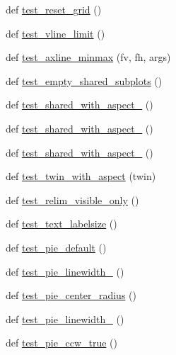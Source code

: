 \begin{DoxyCompactItemize}
\item 
def \hyperlink{namespacematplotlib_1_1tests_1_1test__axes_ac9fc7e9f7ca23303a131d7fdea76069c}{test\+\_\+reset\+\_\+grid} ()
\item 
def \hyperlink{namespacematplotlib_1_1tests_1_1test__axes_a420d03ee67bca5787ed020ebe9044e1a}{test\+\_\+vline\+\_\+limit} ()
\item 
def \hyperlink{namespacematplotlib_1_1tests_1_1test__axes_a05df143c8c93549379ad7799df4618f8}{test\+\_\+axline\+\_\+minmax} (fv, fh, args)
\item 
def \hyperlink{namespacematplotlib_1_1tests_1_1test__axes_af31b41459060dce82d8c95f8ed9f6ff5}{test\+\_\+empty\+\_\+shared\+\_\+subplots} ()
\item 
def \hyperlink{namespacematplotlib_1_1tests_1_1test__axes_a94203e6c3e6bc0da3fd9ae9e48ad9595}{test\+\_\+shared\+\_\+with\+\_\+aspect\+\_} ()
\item 
def \hyperlink{namespacematplotlib_1_1tests_1_1test__axes_ab958a79b383e4010518697699bd13a4f}{test\+\_\+shared\+\_\+with\+\_\+aspect\+\_} ()
\item 
def \hyperlink{namespacematplotlib_1_1tests_1_1test__axes_a825687919e8842f9e9b3162a855f53a9}{test\+\_\+shared\+\_\+with\+\_\+aspect\+\_} ()
\item 
def \hyperlink{namespacematplotlib_1_1tests_1_1test__axes_afad4589bfa1e54d905c9431d8b75a8ff}{test\+\_\+twin\+\_\+with\+\_\+aspect} (twin)
\item 
def \hyperlink{namespacematplotlib_1_1tests_1_1test__axes_aa38d1075707f0f4542c42237587d66d4}{test\+\_\+relim\+\_\+visible\+\_\+only} ()
\item 
def \hyperlink{namespacematplotlib_1_1tests_1_1test__axes_a86a8a84c0a622c0922fee26115fc0a2d}{test\+\_\+text\+\_\+labelsize} ()
\item 
def \hyperlink{namespacematplotlib_1_1tests_1_1test__axes_ab93f039bd36886d306432bbb2e70a570}{test\+\_\+pie\+\_\+default} ()
\item 
def \hyperlink{namespacematplotlib_1_1tests_1_1test__axes_a325eba70c00da5608887630ebe628c9f}{test\+\_\+pie\+\_\+linewidth\+\_} ()
\item 
def \hyperlink{namespacematplotlib_1_1tests_1_1test__axes_a0a2c88cb49a04b28332c2799bd54837c}{test\+\_\+pie\+\_\+center\+\_\+radius} ()
\item 
def \hyperlink{namespacematplotlib_1_1tests_1_1test__axes_a5556195be578b21b9b3b08e20e450602}{test\+\_\+pie\+\_\+linewidth\+\_} ()
\item 
def \hyperlink{namespacematplotlib_1_1tests_1_1test__axes_a44bbdab8899a90b23a8f86d149572819}{test\+\_\+pie\+\_\+ccw\+\_\+true} ()

\end{DoxyCompactItemize}

